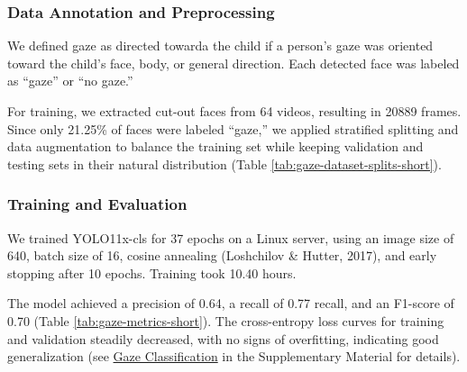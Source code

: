 \documentclass[
  man,floatsintext]{apa6}
\begin{document}
\subsubsection{Data Annotation and Preprocessing}\label{data-annotation-and-preprocessing}

We defined gaze as directed towarda the child if a person's gaze was oriented toward the child's face, body, or general direction. Each detected face was labeled as ``gaze'' or ``no gaze.''

For training, we extracted cut-out faces from 64 videos, resulting in 20889 frames. Since only 21.25\% of faces were labeled ``gaze,'' we applied stratified splitting and data augmentation to balance the training set while keeping validation and testing sets in their natural distribution (Table \ref{tab:gaze-dataset-splits-short}).

\subsubsection{Training and Evaluation}\label{training-and-evaluation}

We trained YOLO11x-cls for 37 epochs on a Linux server, using an image size of 640, batch size of 16, cosine annealing (Loshchilov \& Hutter, 2017), and early stopping after 10 epochs. Training took 10.40 hours.

The model achieved a precision of 0.64, a recall of 0.77 recall, and an F1-score of 0.70 (Table \ref{tab:gaze-metrics-short}). The cross-entropy loss curves for training and validation steadily decreased, with no signs of overfitting, indicating good generalization (see \hyperref[sup-yolo11x-cls]{Gaze Classification} in the Supplementary Material for details).
\end{document}
